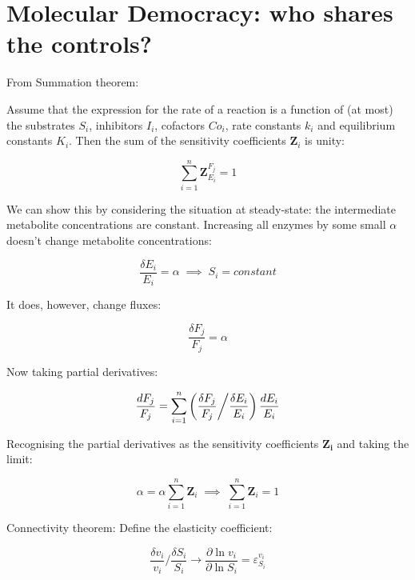 \documentclass[11pt]{article} %
\begin{document}
\section{Molecular Democracy: who shares the controls?}
From \cite{kacser_molecular_1979} Summation theorem:

Assume that the expression for the rate of a reaction is a function of (at most) the substrates $S_{i}$, inhibitors $I_{i}$, cofactors $Co_{i}$, rate constants $k_{i}$ and equilibrium constants $K_{i}$. Then the sum of the sensitivity coefficients $\mathbf{Z}_{i}$ is unity:

\begin{equation}
\sum^{n}_{i=1}\mathbf{Z}^{F_{j}}_{E_{i}} = 1
\end{equation}


We can show this by considering the situation at steady-state: the intermediate metabolite concentrations are constant. Increasing all enzymes by some small $\alpha$ doesn't change metabolite concentrations:

\begin{equation}
\frac{\delta E_{i}}{E_{i}} = \alpha \; \implies \; S_{i} = constant
\end{equation}


It does, however, change fluxes:

\begin{equation}
\frac{\delta F_{j}}{F_{j}} = \alpha
\end{equation}

Now taking partial derivatives:

\begin{equation}
\frac{dF_{j}}{F_{j}} = \sum^{n}_{i=1} \left( \frac{\delta F_{j}}{F_{j}} \middle/ \frac{\delta E_{i}}{E_{i}}  \right) \frac{dE_{i}}{E_{i}}
\end{equation}

Recognising the partial derivatives as the sensitivity coefficients $\mathbf{Z_{i}}$ and taking the limit:

\begin{equation}
\alpha = \alpha \sum^{n}_{i=1}\mathbf{Z}_{i} \; \implies \; \sum^{n}_{i=1}\mathbf{Z}_{i} = 1
\end{equation}

Connectivity theorem:
\newline
\newline
Define the elasticity coefficient:

\begin{equation}
\frac{\delta v_{i}}{v_{i}} \bigg/ \frac{\delta S_{i}}{S_{i}} \to \frac {\partial \ln v_{i}}{\partial \ln S_{i}} = \varepsilon^{v_{i}}_{S_{i}}
\end{equation}
\end{document}
